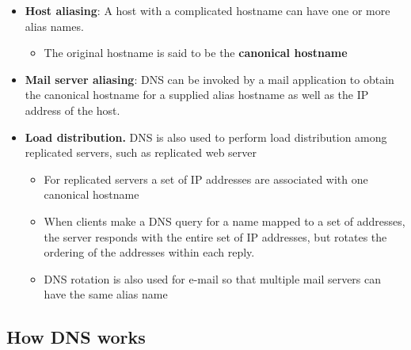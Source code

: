 \documentclass[11pt]{article}
\providecommand{\tightlist}{%
      \setlength{\itemsep}{0pt}\setlength{\parskip}{0pt}}
\begin{document}
\begin{itemize}
  \begin{itemize}
  \tightlist
  \item
    \textbf{Host aliasing}: A host with a complicated hostname can have
    one or more alias names.

    \begin{itemize}
    \tightlist
    \item
      The original hostname is said to be the \textbf{canonical
      hostname}
    \end{itemize}
  \item
    \textbf{Mail server aliasing}: DNS can be invoked by a mail
    application to obtain the canonical hostname for a supplied alias
    hostname as well as the IP address of the host.
  \item
    \textbf{Load distribution.} DNS is also used to perform load
    distribution among replicated servers, such as replicated web server

    \begin{itemize}
    \tightlist
    \item
      For replicated servers a set of IP addresses are associated with
      one canonical hostname
    \item
      When clients make a DNS query for a name mapped to a set of
      addresses, the server responds with the entire set of IP
      addresses, but rotates the ordering of the addresses within each
      reply.
    \item
      DNS rotation is also used for e-mail so that multiple mail servers
      can have the same alias name
    \end{itemize}
  \end{itemize}
\end{itemize}

    \subsection{How DNS works}\label{how-dns-works}
\end{document}
